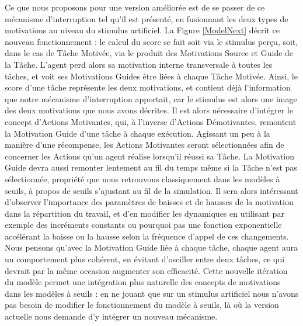 	Ce que nous proposons pour une version améliorée est de se passer de ce mécanisme d'interruption tel qu'il est présenté, en fusionnant les deux types de motivations au niveau du stimulus artificiel. La Figure \ref{ModelNext} décrit ce nouveau fonctionnement : le calcul du score se fait soit via le stimulus perçu, soit, dans le cas de Tâche Motivée, via le produit des Motivations Source et Guide de la Tâche. L'agent perd alors sa motivation interne transversale à toutes les tâches, et voit ses Motivations Guides être liées à chaque Tâche Motivée. Ainsi, le score d'une tâche représente les deux motivations, et contient déjà l'information que notre mécanisme d'interruption apportait, car le stimulus est alors une image des deux motivations que nous avons décrites. Il est alors nécessaire d'intégrer le concept d'Actions Motivantes, qui, à l'inverse d'Actions Démotivantes, remontent la Motivation Guide d'une tâche à chaque exécution. Agissant un peu à la manière d'une récompense, les Actions Motivantes seront sélectionnées afin de concerner les Actions qu'un agent réalise lorsqu'il réussi sa Tâche. La Motivation Guide devra aussi remonter lentement au fil du temps même si la Tâche n'est pas sélectionnée, propriété que nous retrouvons classiquement dans les modèles à seuils, à propos de seuils s'ajustant au fil de la simulation. Il sera alors intéressant d'observer l'importance des paramètres de baisses et de hausses de la motivation dans la répartition du travail, et d'en modifier les dynamiques en utilisant par exemple des incréments constants ou pourquoi pas une fonction exponentielle accélérant la baisse ou la hausse selon la fréquence d'appel de ces changements. Nous pensons qu'avec la Motivation Guide liée à chaque tâche, chaque agent aura un comportement plus cohérent, en évitant d'osciller entre deux tâches, ce qui devrait par la même occasion augmenter son efficacité. Cette nouvelle itération du modèle permet une intégration plus naturelle des concepts de motivations dans les modèles à seuils : en ne jouant que sur un stimulus artificiel nous n'avons pas besoin de modifier le fonctionnement du modèle à seuils, là où la version actuelle nous demande d'y intégrer un nouveau mécanisme.
	
